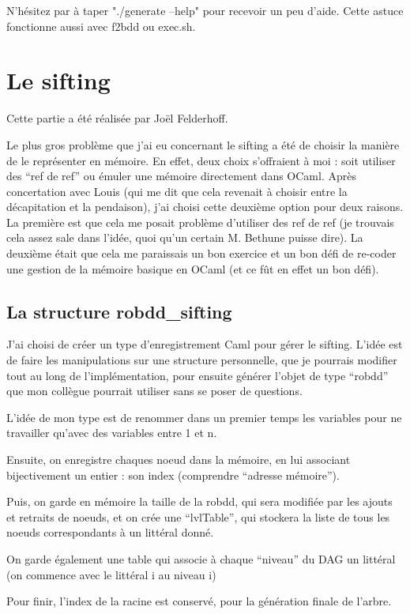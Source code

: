 \documentclass[a4paper,10pt]{article}
\begin{document}
N'hésitez par à taper "./generate --help" pour recevoir un peu d'aide. Cette astuce fonctionne aussi avec f2bdd ou exec.sh.

\section{Le sifting}
Cette partie a été réalisée par Joël Felderhoff.

Le plus gros problème que j'ai eu concernant le sifting a été de choisir la manière de le représenter en mémoire.
En effet, deux choix s'offraient à moi : soit utiliser des ``ref de ref'' ou émuler une mémoire directement dans OCaml. Après concertation avec Louis (qui me dit que cela revenait à choisir entre
la décapitation et la pendaison), j'ai choisi
cette deuxième option pour deux raisons. La première est que cela me posait problème d'utiliser des ref de ref (je trouvais cela assez sale dans l'idée, quoi qu'un certain M. Bethune puisse dire). 
La deuxième était que cela me
paraissais un bon exercice et un bon défi de re-coder une gestion de la mémoire basique en OCaml (et ce fût en effet un bon défi).

\subsection{La structure robdd\_sifting}
J'ai choisi de créer un type d'enregistrement Caml pour gérer le sifting. L'idée est de faire les manipulations sur une structure personnelle, que je pourrais modifier tout au long de 
l'implémentation, pour ensuite générer l'objet de type ``robdd'' que mon collègue pourrait utiliser sans se poser de questions.

L'idée de mon type est de renommer dans un premier temps les variables pour ne travailler qu'avec des variables entre 1 et n.

Ensuite, on enregistre chaques noeud dans la mémoire, en lui associant bijectivement un entier : son index (comprendre ``adresse mémoire''). 

Puis, on garde en mémoire la taille de la robdd, qui sera modifiée par les ajouts et retraits de noeuds, et on crée une ``lvlTable'', qui stockera la liste de tous les noeuds correspondants à un 
littéral donné.

On garde également une table qui associe à chaque ``niveau'' du DAG un littéral (on commence avec le littéral i au niveau i)

Pour finir, l'index de la racine est conservé, pour la génération finale de l'arbre.
\end{document}
